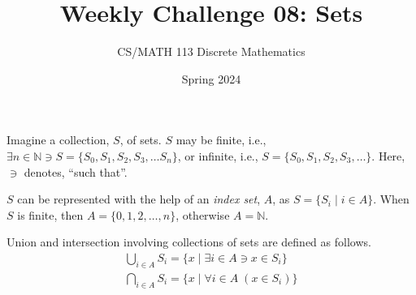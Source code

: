 \documentclass[a4paper]{exam}
\title{Weekly Challenge 08: Sets}
\author{CS/MATH 113 Discrete Mathematics}
\date{Spring 2024}
\newcommand\N{\ensuremath{\mathbb{N}}}
\begin{document}
\maketitle

\begin{questions}

  Imagine a collection, $S$, of sets. $S$ may be finite, i.e., $\exists n\in \N\ni S = \{S_0,S_1,S_2, S_3, \ldots S_n\}$, or infinite, i.e., $S = \{S_0,S_1,S_2, S_3, \ldots \}$. Here, $\ni$ denotes, ``such that''.

  $S$ can be represented with the help of an \textit{index set}, $A$, as $S = \{S_i\mid i \in A\}$. When $S$ is finite, then $A = \{0,1,2,\ldots,n \}$, otherwise $A=\N$.

  Union and intersection involving collections of sets are defined as follows.
  \begin{align*}
    \bigcup_{i \in A}S_i = \{x\mid \exists i \in A \ni x \in S_i\}\\
    \bigcap_{i \in A}S_i = \{x\mid\forall i \in A\; (x \in S_i)\}
  \end{align*}
\end{questions}
\end{document}
